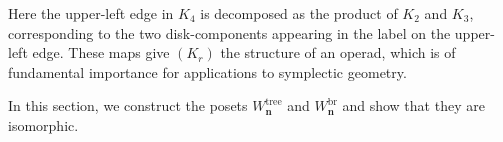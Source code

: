 \documentclass[11pt]{amsart}
\theoremstyle{definition}
\theoremstyle{remark}
\theoremstyle{plain}
\newcommand\bn{\mathbf{n}}
\newcommand{\on}{\operatorname}
\newcommand{\tree}{{\on{tree}}}
\newcommand{\br}{{\on{br}}}
\begin{document}
\begin{enumerate}
\begin{enumerate}
\begin{figure}[H]
\label{fig:operad}
\centering
\def\svgwidth{0.6\columnwidth}

\end{figure}

\noindent
Here the upper-left edge in $K_4$ is decomposed as the product of $K_2$ and $K_3$, corresponding to the two disk-components appearing in the label on the upper-left edge.
These maps give $(K_r)$ the structure of an operad, which is of fundamental importance for applications to symplectic geometry.
\end{enumerate}
\end{enumerate}

\medskip

\noindent {\bf\S\ref{sec:2ass}:}
In this section, we construct the posets $W_\bn^\tree$ and $W_\bn^\br$ and show that they are isomorphic.
\end{document}
